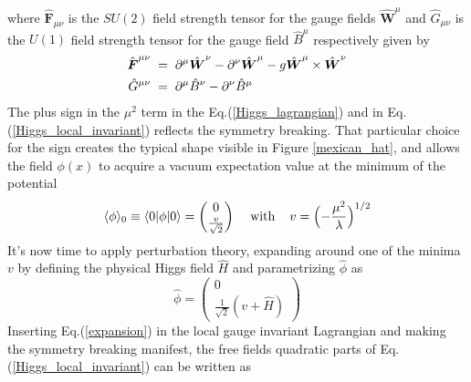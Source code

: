 where $\hat{\boldsymbol{F}}_{\mu\nu}$ is the $SU(2)$ field strength tensor for the gauge fields $\hat{\boldsymbol{W}}^{\mu}$ and $\hat{G}_{\mu\nu}$ is the $U(1)$ field strength tensor for the gauge field $\hat{B}^{\mu}$ respectively given by
\begin{align}
\hat{\boldsymbol{F}}^{\mu\nu}& \hspace{0.1cm}=\hspace{0.1cm} \partial^{\mu}\hat{\boldsymbol{W}}^{\nu}-\partial^{\nu}\hat{\boldsymbol{W}}^{\mu}-g\hat{\boldsymbol{W}}^{\mu}\times\hat{\boldsymbol{W}}^{\nu} \\
\hat{G}^{\mu\nu}& \hspace{0.1cm}=\hspace{0.1cm} \partial^{\mu}\hat{B}^{\nu}-\partial^{\nu}\hat{B}^{\mu}
\end{align}
The plus sign in the $\mu^2$ term in the Eq.(\ref{Higgs_lagrangian}) and in Eq.(\ref{Higgs_local_invariant}) reflects the symmetry breaking. That particular choice for the sign creates the typical shape visible in Figure \ref{mexican_hat}, and allows the field $\phi(x)$ to acquire a vacuum expectation value at the minimum of the potential
\begin{equation}
\langle\phi\rangle_0 \equiv \langle0|\phi|0\rangle = \begin{pmatrix} 
		0 \\ 
		\frac{v}{\sqrt{2}} 
		\end{pmatrix} \hspace{0.4cm} \text{with} \hspace{0.4cm} v = \Bigl(-\frac{\mu^2}{\lambda}\Bigr)^{1/2}
\label{vev}
\end{equation}
It's now time to apply perturbation theory, expanding around one of the minima $v$ by defining the physical Higgs field $\hat{H}$ and parametrizing $\hat{\phi}$ as
\begin{equation}
\hat{\phi} = \begin{pmatrix} 
		0 \\ 
		\frac{1}{\sqrt{2}}(v+\hat{H}) 
		\end{pmatrix}
\label{expansion}
\end{equation}
Inserting Eq.(\ref{expansion}) in the local gauge invariant Lagrangian and making the symmetry breaking manifest, the free fields quadratic parts of Eq.(\ref{Higgs_local_invariant}) can be written as
